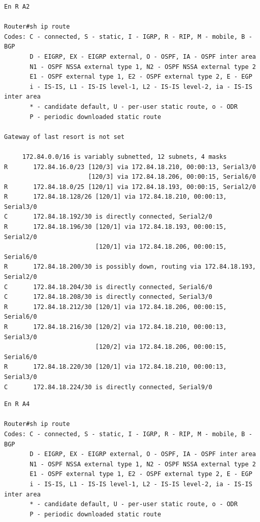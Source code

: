 \documentclass[twoside, 11pt]{article}
\begin{document}
\begin{enumerate}
\begin{center}
\begin{verbatim}
En R A2

Router#sh ip route 
Codes: C - connected, S - static, I - IGRP, R - RIP, M - mobile, B - BGP
       D - EIGRP, EX - EIGRP external, O - OSPF, IA - OSPF inter area
       N1 - OSPF NSSA external type 1, N2 - OSPF NSSA external type 2
       E1 - OSPF external type 1, E2 - OSPF external type 2, E - EGP
       i - IS-IS, L1 - IS-IS level-1, L2 - IS-IS level-2, ia - IS-IS inter area
       * - candidate default, U - per-user static route, o - ODR
       P - periodic downloaded static route

Gateway of last resort is not set

     172.84.0.0/16 is variably subnetted, 12 subnets, 4 masks
R       172.84.16.0/23 [120/3] via 172.84.18.210, 00:00:13, Serial3/0
                       [120/3] via 172.84.18.206, 00:00:15, Serial6/0
R       172.84.18.0/25 [120/1] via 172.84.18.193, 00:00:15, Serial2/0
R       172.84.18.128/26 [120/1] via 172.84.18.210, 00:00:13, Serial3/0
C       172.84.18.192/30 is directly connected, Serial2/0
R       172.84.18.196/30 [120/1] via 172.84.18.193, 00:00:15, Serial2/0
                         [120/1] via 172.84.18.206, 00:00:15, Serial6/0
R       172.84.18.200/30 is possibly down, routing via 172.84.18.193, Serial2/0
C       172.84.18.204/30 is directly connected, Serial6/0
C       172.84.18.208/30 is directly connected, Serial3/0
R       172.84.18.212/30 [120/1] via 172.84.18.206, 00:00:15, Serial6/0
R       172.84.18.216/30 [120/2] via 172.84.18.210, 00:00:13, Serial3/0
                         [120/2] via 172.84.18.206, 00:00:15, Serial6/0
R       172.84.18.220/30 [120/1] via 172.84.18.210, 00:00:13, Serial3/0
C       172.84.18.224/30 is directly connected, Serial9/0
\end{verbatim}
\label{list:2.1.1.4.6}

\begin{verbatim}
En R A4

Router#sh ip route
Codes: C - connected, S - static, I - IGRP, R - RIP, M - mobile, B - BGP
       D - EIGRP, EX - EIGRP external, O - OSPF, IA - OSPF inter area
       N1 - OSPF NSSA external type 1, N2 - OSPF NSSA external type 2
       E1 - OSPF external type 1, E2 - OSPF external type 2, E - EGP
       i - IS-IS, L1 - IS-IS level-1, L2 - IS-IS level-2, ia - IS-IS inter area
       * - candidate default, U - per-user static route, o - ODR
       P - periodic downloaded static route


\end{verbatim}
\end{center}
\end{enumerate}
\end{document}
